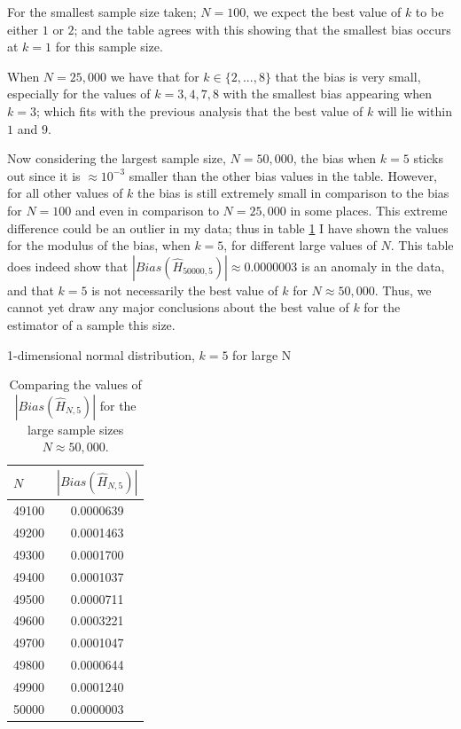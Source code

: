 \documentclass[12pt]{report}
\begin{document}
For the smallest sample size taken; $N=100$, we expect the best value of $k$ to be either $1$ or $2$; and the table agrees with this showing that the smallest bias occurs at $k=1$ for this sample size. 

When $N=25,000$ we have that for $k \in \{2,..., 8\}$ that the bias is very small, especially for the values of $k=3, 4, 7, 8$ with the smallest bias appearing when $k=3$; which fits with the previous analysis that the best value of $k$ will lie within $1$ and $9$.

Now considering the largest sample size, $N=50,000$, the bias when $k=5$ sticks out since it is $\approx 10^{-3}$ smaller than the other bias values in the table. However, for all other values of $k$ the bias is still extremely small in comparison to the bias for $N=100$ and even in comparison to $N=25,000$ in some places. This extreme difference could be an outlier in my data; thus in table \ref{normal_k5_table} I have shown the values for the modulus of the bias, when $k=5$, for different large values of $N$. This table does indeed show that $|Bias(\hat{H}_{50000, 5})| \approx 0.0000003$ is an anomaly in the data, and that $k=5$ is not necessarily the best value of $k$ for $N \approx 50,000$. Thus, we cannot yet draw any major conclusions about the best value of $k$ for the estimator of a sample this size.

\begin{table}
\caption{1-dimensional normal distribution, $k=5$ for large N} \label{normal_k5_table}
\begin{center}
\begin{tabular}{| l | c |} 
\toprule
$N$ &  $|Bias(\hat{H}_{N, 5})|$ \\
\midrule[1pt]
49100    & 0.0000639   \\
49200    & 0.0001463   \\
49300    & 0.0001700   \\
49400    & 0.0001037   \\
49500    & 0.0000711   \\
49600    & 0.0003221   \\
49700    & 0.0001047   \\
49800    & 0.0000644   \\
49900    & 0.0001240   \\
50000    & 0.0000003   \\
\hline
\end{tabular}
\\[10pt]
\caption*{Comparing the values of $|Bias(\hat{H}_{N, 5})|$ for the large sample sizes $N \approx 50,000$.}
\end{center}
\end{table}
\end{document}
